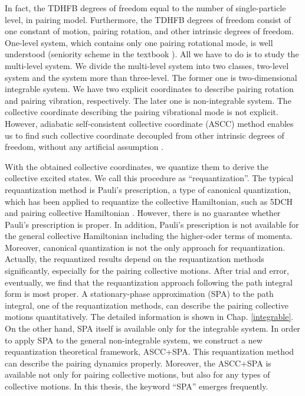 \documentclass[11pt]{book} %
\begin{document}
In fact, the TDHFB degrees of freedom equal to the number of single-particle level, in pairing model. Furthermore, the TDHFB degrees of freedom consist of one constant of motion, pairing rotation, and other intrinsic degrees of freedom. One-level system, which contains only one pairing rotational mode, is well understood (seniority scheme in the textbook \cite{RS80}). All we have to do is to study the multi-level system. We divide the multi-level system into two classes, two-level system and the system more than three-level. The former one is two-dimensional integrable system. We have two explicit coordinates to describe pairing rotation and pairing vibration, respectively. The later one is non-integrable system. The collective coordinate describing the pairing vibrational mode is not explicit. However, adiabatic self-consistent collective coordinate (ASCC) method  enables us to find such collective coordinate decoupled from other intrinsic degrees of freedom, without any artificial assumption \cite{MNM00, N2012}. 

With the obtained collective coordinates, we quantize them to derive the collective excited states. We call this procedure as ``requantization''. The typical requantization method is Pauli's prescription, a type of canonical quantization, which has been applied to requantize the collective Hamiltonian, such as 5DCH \cite{KB67} and pairing collective Hamiltonian \cite{BBPK70}. However, there is no guarantee whether Pauli's prescription is proper. In addition, Pauli's prescription is not available for the general collective Hamiltonian including the higher-oder terms of momenta. Moreover, canonical quantization is not the only approach for requantization. Actually, the requantized results depend on the requantization methods significantly, especially for the pairing collective motions.
After trial and error, eventually, we find that the requantization approach following the path integral form is most proper. A stationary-phase approximation (SPA) to the path integral, one of the requantization methods, can describe the pairing collective motions quantitatively. The detailed information is shown in Chap. \ref{integrable}.
On the other hand, SPA itself is available only for the integrable system. In order to apply SPA to the general non-integrable system, we construct a new requantization theoretical framework, ASCC+SPA. This requantization method can describe the pairing dynamics properly. Moreover, the ASCC+SPA is available not only for pairing collective motions, but also for any types of collective motions. In this thesis, the keyword ``SPA'' emerges frequently.
\end{document}
